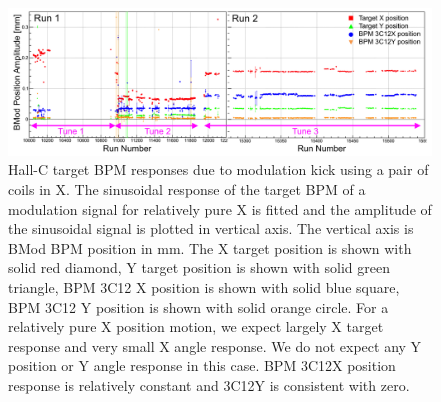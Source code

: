 \begin{singlespace}
\begin{figure}[!h]
	\begin{center}
	\includegraphics[width=15.0cm]{figures/BMod_XMod_Xresponse}
	\end{center}
	\caption
	{
Hall-C target BPM responses due to modulation kick using a pair of coils in X. The sinusoidal response of the target BPM of a modulation signal for relatively pure X is fitted and the amplitude of the sinusoidal signal is plotted in vertical axis. The vertical axis is BMod BPM position in mm. The X target position is shown with solid red diamond, Y target position is shown with solid green triangle, BPM 3C12 X position is shown with solid blue square, BPM 3C12 Y position is shown with solid orange circle. For a relatively pure X position motion, we expect largely X target response and very small X angle response. We do not expect any Y position or Y angle response in this case. BPM 3C12X position response is relatively constant and 3C12Y is consistent with zero.		
	 }
	\label{fig:BMod_XMod_Xresponse}
\end{figure}
\end{singlespace}


